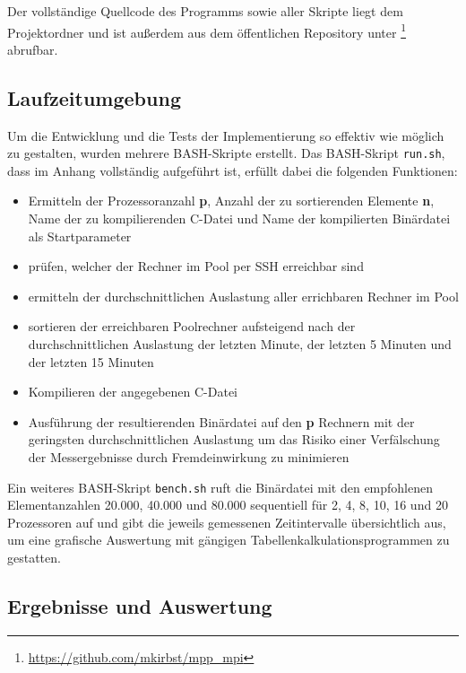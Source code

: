 \documentclass[a4paper,12pt]{scrartcl}
\begin{document}
Der vollst\"andige Quellcode des Programms sowie aller Skripte liegt dem Projektordner und ist au\ss{}erdem aus dem \"offentlichen Repository unter
\footnote{\url{https://github.com/mkirbst/mpp_mpi}} abrufbar.

\subsection{Laufzeitumgebung}
Um die Entwicklung und die Tests der Implementierung so effektiv wie m\"oglich zu gestalten, wurden mehrere BASH-Skripte erstellt.
Das BASH-Skript \texttt{run.sh}, dass im Anhang vollst\"andig aufgef\"uhrt ist,  erf\"ullt dabei die folgenden Funktionen:
\begin{itemize}
 \item Ermitteln der Prozessoranzahl \textbf{p}, Anzahl der zu sortierenden Elemente \textbf{n}, Name der zu kompilierenden C-Datei und Name der kompilierten
Bin\"ardatei als Startparameter
 \item pr\"ufen, welcher der Rechner im Pool per SSH erreichbar sind
 \item ermitteln der durchschnittlichen Auslastung aller errichbaren Rechner im Pool
 \item sortieren der erreichbaren Poolrechner aufsteigend nach der durchschnittlichen Auslastung der letzten Minute, der letzten 5 Minuten und der letzten 15
Minuten
 \item Kompilieren der angegebenen C-Datei
 \item Ausf\"uhrung der resultierenden Bin\"ardatei auf den \textbf{p} Rechnern mit der geringsten durchschnittlichen Auslastung um das Risiko einer
Verf\"alschung der Messergebnisse durch Fremdeinwirkung zu minimieren
\end{itemize}

Ein weiteres BASH-Skript \texttt{bench.sh} ruft die Bin\"ardatei mit den empfohlenen Elementanzahlen 20.000, 40.000 und 80.000 sequentiell f\"ur 2, 4,
8, 10, 16 und 20 Prozessoren auf und gibt die jeweils gemessenen Zeitintervalle \"ubersichtlich aus, um eine grafische Auswertung mit g\"angigen
Tabellenkalkulationsprogrammen zu gestatten. 

\subsection{Ergebnisse und Auswertung}
\end{document}
